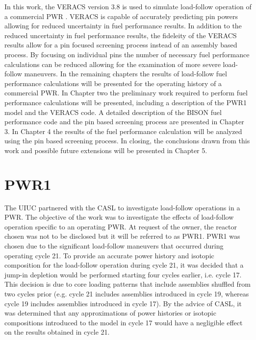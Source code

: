 \documentclass[edeposit,fullpage,11pt]{uiucthesis2009}
\begin{document}
In this work, the \gls{VERACS} version 3.8 is used to simulate load-follow operation of a commercial \gls{PWR} \cite{turner_virtual_2016}.
\gls{VERACS} is capable of accurately predicting pin powers allowing for reduced uncertainty in fuel performance results.
In addition to the reduced uncertainty in fuel performance results, the fideleity of the \gls{VERACS} results allow for a pin focused screening process instead of an assembly based process.
By focusing on individual pins the number of necessary fuel performance calculations can be reduced allowing for the examination of more severe load-follow maneuvers.
In the remaining chapters the results of load-follow fuel performance calculations will be presented for the operating history of a commercial \gls{PWR}.
In Chapter two the preliminary work required to perform fuel performance calculations will be presented, including a description of the PWR1 model and the \gls{VERACS} code. 
A detailed description of the BISON fuel performance code and the pin based screening process are presented in Chapter 3.
In Chapter 4 the results of the fuel performance calculation will be analyzed using the pin based screening process.
In closing, the conclusions drawn from this work and possible future extensions will be presented in Chapter 5.


\chapter{PWR1}
The \gls{UIUC} partnered with the \gls{CASL} to investigate load-follow operations in a PWR. 
The objective of the work was to investigate the effects of load-follow operation specific to an operating PWR. 
At request of the owner, the reactor chosen was not to be disclosed but it will be referred to as PWR1.
PWR1 was chosen due to the significant load-follow maneuvers that occurred during operating cycle 21. 
To provide an accurate power history and isotopic composition for the load-follow operation during cycle 21, it was decided that a jump-in depletion would be performed starting four cycles earlier, i.e. cycle 17. 
This decision is due to core loading patterns that include assemblies shuffled from two cycles prior (e.g. cycle 21 includes assemblies introduced in cycle 19, whereas cycle 19 includes assemblies introduced in cycle 17). 
By the advice of \gls{CASL}, it was determined that any approximations of power histories or isotopic compositions introduced to the model in cycle 17 would have a negligible effect on the results obtained in cycle 21.
\end{document}

